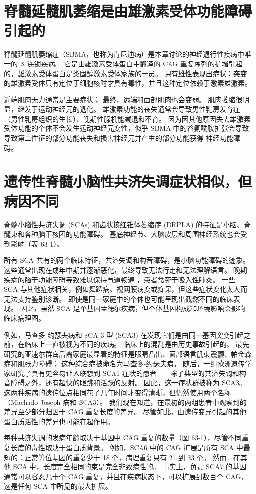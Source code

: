 \section{脊髓延髓肌萎缩是由雄激素受体功能障碍引起的}
脊髓延髓肌萎缩症（SBMA，也称为肯尼迪病）是本章讨论的神经退行性疾病中唯一的 X 连锁疾病。 它是由雄激素受体蛋白中翻译的 CAG 重复序列的扩增引起的，雄激素受体蛋白是类固醇激素受体家族的一员。 只有雄性表现出症状：突变的雄激素受体只有定位于细胞核时才具有毒性，并且这种定位依赖于激素雄激素。

近端肌肉无力通常是主要症状； 最终，远端和面部肌肉也会变弱。 肌肉萎缩很明显，继发于运动神经元的退化。 雄激素功能的丧失通常会导致男性乳房发育症（男性乳房组织的生长）、晚期性腺机能减退和不育。 因为因其他原因失去雄激素受体功能的个体不会发生运动神经元变性，似乎 SBMA 中的谷氨酰胺扩张会导致导致第二性征的部分功能丧失和损害神经元并产生的部分功能获得 神经功能障碍。

\section{遗传性脊髓小脑性共济失调症状相似，但病因不同}

脊髓小脑性共济失调 (SCAs) 和齿状核红锥体萎缩症 (DRPLA) 的特征是小脑、脊髓束和各种脑干核团的功能障碍。 基底神经节、大脑皮层和周围神经系统也会受到影响（表 63-1）。

所有 SCA 共有的两个临床特征，共济失调和构音障碍，是小脑功能障碍的迹象。 这些通常出现在成年中期并逐渐恶化，最终导致无法行走和无法理解语言。 晚期疾病的脑干功能障碍导致难以保持气道畅通； 患者常死于吸入性肺炎。 一些 SCA 与其他症状相关，例如舞蹈病、视网膜病变或痴呆，但这些症状变化太大而无法支持鉴别诊断。 即使是同一家庭中的个体也可能呈现出截然不同的临床表现。 因此，虽然 SCA 是单基因孟德尔疾病，但个体基因构成和环境影响会影响临床病理图。

例如，马查多-约瑟夫病和 SCA 3 型 (SCA3) 在发现它们是由同一基因突变引起之前，在临床上一直被视为不同的疾病。 临床上的混乱是由历史事故引起的。 最先研究的亚速尔群岛后裔家庭最显着的特征是眼睛凸出、面部语言肌束震颤、帕金森症和肌张力障碍； 这种综合症被命名为马查多-约瑟夫病。 随后，一组欧洲遗传学家研究了具有更容易让人联想到 SCA1 症状的患者——除了典型的共济失调和构音障碍之外，还有超快的眼跳和活跃的反射。 因此，这一症状群被称为 SCA3。 这两种疾病的遗传位点相同花了几年时间才变得清晰，但仍然使用两个名称（Machado-Joseph 病和 SCA3）。 我们现在知道，在最初的两组患者中观察到的差异至少部分归因于 CAG 重复长度的差异。 尽管如此，由遗传变异引起的其他蛋白质活性的差异也可能在起作用。

每种共济失调的发病年龄取决于基因中 CAG 重复的数量（图 63-1），尽管不同重复长度的毒性取决于蛋白质背景。 例如，SCA6 中的 CAG 扩展是所有 SCA 中最短的：正常等位基因的重复少于 18 个，病理重复只有 21 到 33 个。 然而，在其他 SCA 中，长度完全相同的束是完全非致病性的。 事实上，负责 SCA7 的基因通常可以容忍几十个 CAG 重复，并且在疾病状态下，可以扩展到数百个 CAG，这是任何 SCA 中所见的最大扩展。


